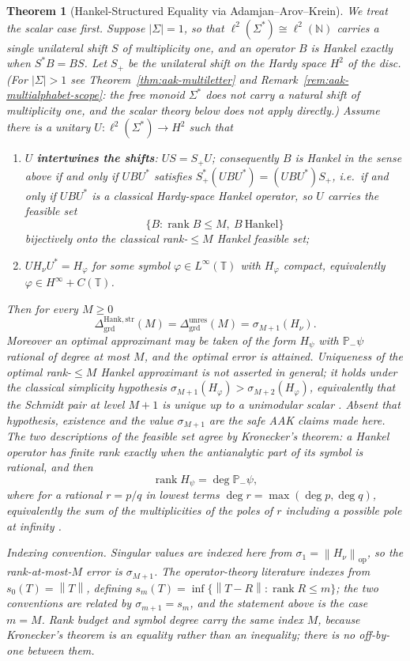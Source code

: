 \documentclass[12pt]{article}
\newtheorem{theorem}{Theorem}[section]
\theoremstyle{definition}
\DeclareMathOperator{\rank}{rank}
\newcommand{\norm}[1]{\left\lVert#1\right\rVert}
\newcommand{\Dunres}{\Delta_{\mathrm{grd}}^{\mathrm{unres}}}
\newcommand{\DHankstr}{\Delta_{\mathrm{grd}}^{\mathrm{Hank,str}}}
\begin{document}
\begin{theorem}[Hankel-Structured Equality via Adamjan--Arov--Krein]
\label{thm:aak-equality}
We treat the scalar case first.  Suppose $|\Sigma|=1$, so that
$\ell^2(\Sigma^*)\cong\ell^2(\mathbb N)$ carries a single unilateral shift $S$
of multiplicity one, and an operator $B$ is Hankel exactly when $S^{*}B=BS$.
Let $S_+$ be the unilateral shift on the Hardy space $H^2$ of the disc.  (For
$|\Sigma|>1$ see Theorem~\ref{thm:aak-multiletter} and
Remark~\ref{rem:aak-multialphabet-scope}: the free monoid $\Sigma^*$ does
\emph{not} carry a natural shift of multiplicity one, and the scalar theory
below does not apply directly.)  Assume there is a unitary
$U:\ell^2(\Sigma^*)\to H^2$ such that
\begin{enumerate}[label=(\alph*)]
\item $U$ \textbf{intertwines the shifts}: $US=S_+U$; consequently $B$ is
Hankel in the sense above if and only if $UBU^{*}$ satisfies
$S_+^{*}(UBU^{*})=(UBU^{*})S_+$, i.e.\ if and only if $UBU^{*}$ is a
classical Hardy-space Hankel operator, so $U$ carries the feasible set
\[
\{B:\operatorname{rank}B\le M,\ B\ \text{Hankel}\}
\]
\emph{bijectively} onto the classical rank-$\le M$ Hankel feasible set;
\item $UH_\nu U^{*}=H_\varphi$ for some symbol
$\varphi\in L^\infty(\mathbb T)$ with $H_\varphi$ compact, equivalently
$\varphi\in H^\infty+C(\mathbb T)$.
\end{enumerate}
Then for every $M\ge0$
\[
\DHankstr(M)
=
\Dunres(M)
=
\sigma_{M+1}(H_\nu).
\]
Moreover an optimal approximant may be taken of the form $H_\psi$ with
$\mathbb P_-\psi$ rational of degree at most $M$, and the optimal error is
attained.  Uniqueness of the optimal rank-$\le M$ Hankel approximant is
\emph{not} asserted in general; it holds under the classical simplicity
hypothesis $\sigma_{M+1}(H_\varphi)>\sigma_{M+2}(H_\varphi)$, equivalently
that the Schmidt pair at level $M+1$ is unique up to a unimodular scalar
\cite[Ch.~4]{peller2003}.  Absent that hypothesis, existence and the value
$\sigma_{M+1}$ are the safe AAK claims made here.  The two descriptions of the feasible
set agree by Kronecker's theorem: a Hankel operator has finite rank exactly
when the antianalytic part of its symbol is rational, and then
\[
\rank H_\psi=\deg\mathbb P_-\psi ,
\]
where for a rational $r=p/q$ in lowest terms $\deg r=\max(\deg p,\deg q)$,
equivalently the sum of the multiplicities of the poles of $r$ including a
possible pole at infinity \cite[Sec.~4]{peller2003}.

\emph{Indexing convention.}  Singular values are indexed here from
$\sigma_1=\norm{H_\nu}_{\mathrm{op}}$, so the rank-at-most-$M$ error is
$\sigma_{M+1}$.  The operator-theory literature indexes from
$s_0(T)=\norm{T}$, defining $s_m(T)=\inf\{\norm{T-R}:\rank R\le m\}$; the two
conventions are related by $\sigma_{m+1}=s_m$, and the statement above is the
case $m=M$.  Rank budget and symbol degree carry the \emph{same} index $M$,
because Kronecker's theorem is an equality rather than an inequality; there is
no off-by-one between them.
\end{theorem}
\end{document}
